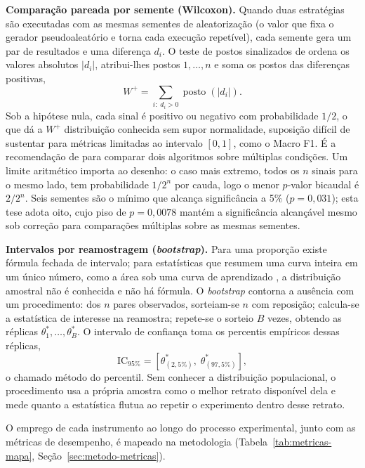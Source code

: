 \textbf{Comparação pareada por semente (Wilcoxon).} Quando duas estratégias
são executadas com as mesmas sementes de aleatorização (o valor que fixa o
gerador pseudoaleatório e torna cada execução repetível), cada semente gera
um par de resultados e uma diferença $d_i$. O teste de postos sinalizados de
\citet{Wilcoxon1945} ordena os valores absolutos $|d_i|$, atribui-lhes postos
$1,\dots,n$ e soma os postos das diferenças positivas,
\begin{equation}
W^{+} = \sum_{i:\; d_i>0} \operatorname{posto}(|d_i|).
\label{eq:wilcoxon}
\end{equation}
Sob a hipótese nula, cada sinal é positivo ou negativo com probabilidade
$1/2$, o que dá a $W^{+}$ distribuição conhecida sem supor normalidade,
suposição difícil de sustentar para métricas limitadas ao intervalo $[0,1]$,
como o Macro F1. É a recomendação de \citet{Demsar2006} para comparar dois
algoritmos sobre múltiplas condições. Um limite aritmético importa ao
desenho: o caso mais extremo, todos os $n$ sinais para o mesmo lado, tem
probabilidade $1/2^{n}$ por cauda, logo o menor $p$-valor bicaudal é
$2/2^{n}$. Seis sementes são o mínimo que alcança significância a 5\%
($p=0{,}031$); esta tese adota oito, cujo piso de $p=0{,}0078$ mantém a
significância alcançável mesmo sob correção para comparações múltiplas sobre
as mesmas sementes.

\textbf{Intervalos por reamostragem (\textit{bootstrap}).} Para uma proporção
existe fórmula fechada de intervalo; para estatísticas que resumem uma curva
inteira em um único número, como a área sob uma curva de aprendizado
\citep{Guyon2011ALC}, a distribuição amostral não é conhecida e não há
fórmula. O \textit{bootstrap} \citep{EfronTibshirani1993} contorna a ausência
com um procedimento: dos $n$ pares observados, sorteiam-se $n$ com reposição;
calcula-se a estatística de interesse na reamostra; repete-se o sorteio $B$
vezes, obtendo as réplicas $\theta^{*}_{1},\dots,\theta^{*}_{B}$. O
intervalo de confiança toma os percentis empíricos dessas réplicas,
\begin{equation}
\mathrm{IC}_{95\%} = \left[\theta^{*}_{(2{,}5\%)},\; \theta^{*}_{(97{,}5\%)}\right],
\label{eq:bootstrap}
\end{equation}
o chamado método do percentil. Sem conhecer a distribuição populacional, o
procedimento usa a própria amostra como o melhor retrato disponível dela e
mede quanto a estatística flutua ao repetir o experimento dentro desse
retrato.

O emprego de cada instrumento ao longo do processo experimental, junto com
as métricas de desempenho, é mapeado na metodologia
(Tabela~\ref{tab:metricas-mapa}, Seção~\ref{sec:metodo-metricas}).

